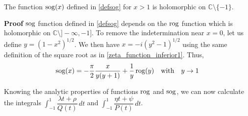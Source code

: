 \begin{lemma}
\label{lemma_sog}
The function ${\rm sog}(x)$ defined in \eqref{defsog} for $x>1$ is holomorphic on $\mathbb{C}\setminus \{-1\}$.
\end{lemma}


{\bf Proof}
${\rm sog}$ function defined in \eqref{defsog} depends on the $\rm rog$ function which is holomorphic on $\mathbb{C}\setminus \rbrack - \infty, -1 \rbrack$. To remove the indetermination near $x=0$, let us define $y=\left( 1-x^2 \right)^{1/2}$. We then have $x = -i \left( y^2 -1 \right)^{1/2} $ using the same definition of the square root as in \eqref{zeta_function_inferior1}. Thus,
\begin{equation}
{\rm sog}(x) = - \dfrac{\pi}{2} \dfrac{x}{y(y+1)} + \dfrac{1}{y} \, {\rm rog}(y) \quad \text{with} \quad y \rightarrow  1
\end{equation}

Knowing the analytic properties of functions $\rm rog$ and ${\rm sog}$, we can now calculate the integrals $\int_{-1}^1 \dfrac{\lambda t +\rho}{Q(t)}\, dt$ and $\int_{-1}^1 \dfrac{\eta t +\psi}{P(t)}\, dt$.


